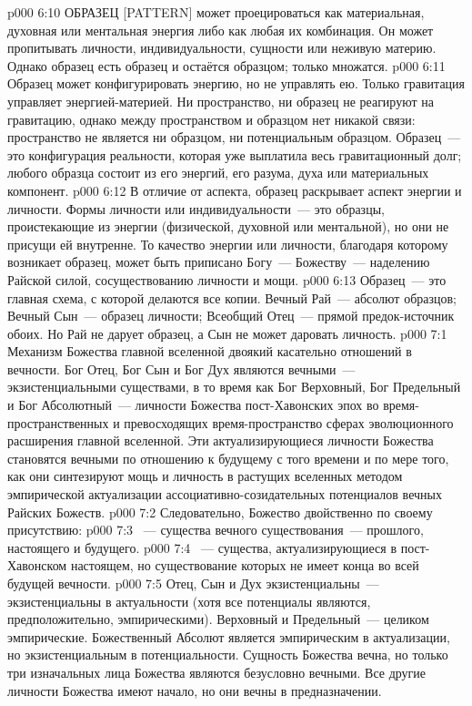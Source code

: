 \vs p000 6:10 \pc ОБРАЗЕЦ [PATTERN] может проецироваться как материальная, духовная или ментальная энергия либо как любая их комбинация. Он может пропитывать личности, индивидуальности, сущности или неживую материю. Однако образец есть образец и остаётся образцом; только  множатся.
\vs p000 6:11 Образец может конфигурировать энергию, но не управлять ею. Только гравитация управляет энергией\hyp{}материей. Ни пространство, ни образец не реагируют на гравитацию, однако между пространством и образцом нет никакой связи: пространство не является ни образцом, ни потенциальным образцом. Образец~--- это конфигурация реальности, которая уже выплатила весь гравитационный долг;  любого образца состоит из его энергий, его разума, духа или материальных компонент.
\vs p000 6:12 В отличие от  аспекта, образец раскрывает  аспект энергии и личности. Формы личности или индивидуальности~--- это образцы, проистекающие из энергии (физической, духовной или ментальной), но они не присущи ей внутренне. То качество энергии или личности, благодаря которому возникает образец, может быть приписано Богу~--- Божеству~--- наделению Райской силой, сосуществованию личности и мощи.
\vs p000 6:13 Образец~--- это главная схема, с которой делаются все копии. Вечный Рай~--- абсолют образцов; Вечный Сын~--- образец личности; Всеобщий Отец~--- прямой предок\hyp{}источник обоих. Но Рай не дарует образец, а Сын не может даровать личность.
\vs p000 7:1 Механизм Божества главной вселенной двоякий касательно отношений в вечности. Бог Отец, Бог Сын и Бог Дух являются вечными~--- экзистенциальными существами, в то время как Бог Верховный, Бог Предельный и Бог Абсолютный~---  личности Божества пост\hyp{}Хавонских эпох во время\hyp{}пространственных и превосходящих время\hyp{}пространство сферах эволюционного расширения главной вселенной. Эти актуализирующиеся личности Божества становятся вечными по отношению к будущему с того времени и по мере того, как они синтезируют мощь и личность в растущих вселенных методом эмпирической актуализации ассоциативно\hyp{}созидательных потенциалов вечных Райских Божеств.
\vs p000 7:2 Следовательно, Божество двойственно по своему присутствию:
\vs p000 7:3 ~--- существа вечного существования~--- прошлого, настоящего и будущего.
\vs p000 7:4 ~--- существа, актуализирующиеся в пост\hyp{}Хавонском настоящем, но существование которых не имеет конца во всей будущей вечности.
\vs p000 7:5 \pc Отец, Сын и Дух экзистенциальны~--- экзистенциальны в актуальности (хотя все потенциалы являются, предположительно, эмпирическими). Верховный и Предельный~--- целиком эмпирические. Божественный Абсолют является эмпирическим в актуализации, но экзистенциальным в потенциальности. Сущность Божества вечна, но только три изначальных лица Божества являются безусловно вечными. Все другие личности Божества имеют начало, но они вечны в предназначении.
